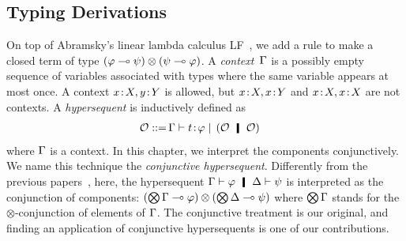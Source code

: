 \subsection{Typing Derivations}

On top of Abramsky's linear lambda calculus
LF~\citep{abramsky1993computational}, we add a rule to
make a closed term of type $(\varphi\multimap\psi)\otimes(\psi\multimap\varphi)$.
A \textit{context}~$\Gamma$ is a possibly empty sequence of
variables associated with
types where the same variable appears at most once.
A context ${x} \mathord{\colon\kern -2pt}{X}, {y} \mathord{\colon\kern -2pt}{Y}$ is allowed, but ${x} \mathord{\colon\kern -2pt}{X}, {x} \mathord{\colon\kern -2pt}{Y}$
and ${x} \mathord{\colon\kern -2pt}{X},{x} \mathord{\colon\kern -2pt}{X}$ are not contexts.
A \textit{hypersequent} is inductively defined as
\begin{align*}
 \hypert ::=\, &\G\tr\tj{t}{\phi}
 \mid\, (\hypert\hmid \hypert)
\end{align*}
where $\Gamma$ is a context.
In this chapter, we interpret the components conjunctively.
We name this technique the \textit{conjunctive
hypersequent}.
Differently from the previous
papers~\citep{avron91,Baaz01122003,avrontableau,avron96},
here, the hypersequent $\G\tr\phi\hmid \D\tr\psi$ is interpreted as the
conjunction of components:
$(\bigotimes\Gamma\multimap\varphi)\otimes (\bigotimes\Delta\multimap\psi)$ where
$\bigotimes\Gamma$ stands for the $\otimes$-conjunction of elements of $\Gamma$.
The conjunctive treatment is our original, and finding an application
of conjunctive hypersequents is one of our contributions.

